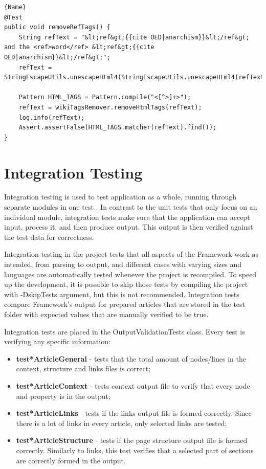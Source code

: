 \documentclass[thesis=M,english,hidelinks]{FITthesis}[2019/12/23]
\begin{document}
\begin{lstlisting}[caption=Regression Testing,frame=tlrb,  label = {lst:regression-test-example}]{Name}
@Test
public void removeRefTags() {
	String refText = "&lt;ref&gt;{{cite OED|anarchism}}&lt;/ref&gt; and the <ref>word</ref> &lt;ref&gt;{{cite OED|anarchism}}&lt;/ref&gt;";
	refText = StringEscapeUtils.unescapeHtml4(StringEscapeUtils.unescapeHtml4(refText));

	Pattern HTML_TAGS = Pattern.compile("<[^>]+>");
	refText = wikiTagsRemover.removeHtmlTags(refText);
	log.info(refText);
	Assert.assertFalse(HTML_TAGS.matcher(refText).find());
}
\end{lstlisting}

\section{Integration Testing}

Integration testing is used to test application as a whole, running through separate modules in one test \cite{integration_test1}. In contrast to the unit tests that only focus on an individual module, integration tests make sure that the application can accept input, process it, and then produce output\cite{integration_test2}. This output is then verified against the test data for correctness.


Integration testing in the project tests that all aspects of the Framework work as intended, from parsing to output, and different cases with varying sizes and languages are automatically tested whenever the project is recompiled. To speed up the development, it is possible to skip those tests by compiling the project with -DskipTests argument, but this is not recommended. Integration tests compare Framework's output for prepared articles that are stored in the test folder with expected values that are manually verified to be true. 

Integration tests are placed in the OutputValidationTests class. Every test is verifying any specific information:

\begin{itemize}
	\item \textbf{test*ArticleGeneral} - tests that the total amount of nodes/lines in the context, structure and links files is correct;
	\item \textbf{test*ArticleContext} - tests context output file to verify that every node and property is in the output;
	\item \textbf{test*ArticleLinks} - tests if the links output file is formed correctly. Since there is a lot of links in every article, only selected links are tested;
	\item \textbf{test*ArticleStructure} - tests if the page structure output file is formed correctly. Similarly to links, this test verifies that a selected part of sections are correctly formed in the output.
\end{itemize}
\end{document}
